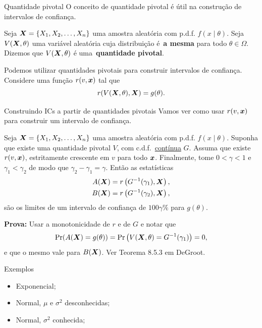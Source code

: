 \begin{frame}{Quantidade pivotal}
 O conceito de quantidade pivotal é útil na construção de intervalos de confiança.
 \begin{defn}
   Seja $\boldsymbol{X} = \{ X_1, X_2, \ldots, X_n \}$ uma amostra aleatória com p.d.f. $f(x\mid \theta)$.
   Seja $V(\boldsymbol{X}, \theta)$ uma variável aleatória cuja distribuição é~\textbf{a mesma} para todo $\theta \in \Omega$.
   Dizemos que $V(\boldsymbol{X}, \theta)$ é uma~\textbf{quantidade pivotal}.
 \end{defn}
Podemos utilizar quantidades pivotais para construir intervalos de confiança.
Considere uma função $r(v, \boldsymbol{x})$ tal que
\[ r(V(\boldsymbol{X}, \theta), \boldsymbol{X}) = g(\theta). \]
\end{frame}

\begin{frame}{Construindo ICs a partir de quantidades pivotais}
 Vamos ver como usar $r(v, \boldsymbol{x})$ para construir um intervalo de confiança.
 \begin{theo}
     Seja $\boldsymbol{X} = \{ X_1, X_2, \ldots, X_n \}$ uma amostra aleatória com p.d.f. $f(x\mid \theta)$.
     Suponha que existe uma quantidade pivotal $V$, com c.d.f.~\underline{contínua} $G$.
     Assuma que existe $r(v, \boldsymbol{x})$, estritamente crescente em $v$ para todo $\boldsymbol{x}$.
     Finalmente, tome $ 0 < \gamma < 1$ e $\gamma_1 < \gamma_2$ de modo que $\gamma_2 - \gamma_1 = \gamma$.
     Então as estatísticas
     \begin{align*}
      A(\boldsymbol{X}) = r\left(G^{-1}(\gamma_1), \boldsymbol{X} \right),\\
      B(\boldsymbol{X}) = r\left(G^{-1}(\gamma_2), \boldsymbol{X} \right),
     \end{align*}
são os limites de um intervalo de confiança de $100\gamma\%$ para $g(\theta)$.
 \end{theo}
\textbf{Prova:} Usar a monotonicidade de $r$ e de $G$ e notar que 
$$\operatorname{Pr}(A(\boldsymbol{X}) = g(\theta)) = \operatorname{Pr}\left(V(\boldsymbol{X}, \theta) = G^{-1}(\gamma_1)\right) = 0,$$
e que o mesmo vale para $B(\boldsymbol{X})$.
Ver Teorema 8.5.3 em DeGroot.
\end{frame}

\begin{frame}{Exemplos}
 \begin{itemize}
  \item Exponencial;
  \item Normal, $\mu$ e $\sigma^2$ desconhecidas;
  \item Normal, $\sigma^2$ conhecida;
 \end{itemize}
\end{frame}

